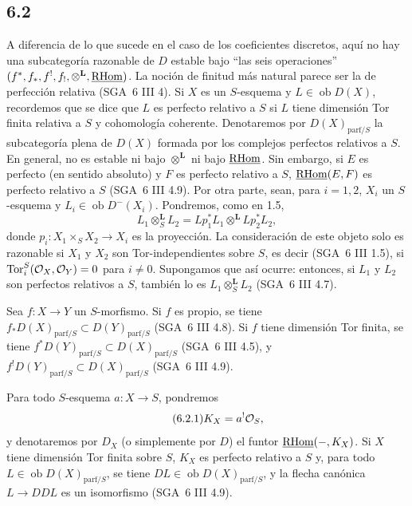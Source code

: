 \subsection*{6.2}
A diferencia de lo que sucede en el caso de los coeficientes discretos, aquí no hay una subcategoría razonable de $D$ estable bajo ``las seis operaciones'' $(f^*,f_*,f^!,f_!,\otimes^{\mathbf L},\underline{\mathrm{RHom}})$. La noción de finitud más natural parece ser la de perfección relativa (SGA~6 III 4). Si $X$ es un $S$-esquema y $L\in\operatorname{ob}D(X)$, recordemos que se dice que $L$ es perfecto relativo a $S$ si $L$ tiene dimensión Tor finita relativa a $S$ y cohomología coherente. Denotaremos por $D(X)_{\mathrm{parf}/S}$ la subcategoría plena de $D(X)$ formada por los complejos perfectos relativos a $S$. En general, no es estable ni bajo $\otimes^{\mathbf L}$ ni bajo $\underline{\mathrm{RHom}}$. Sin embargo, si $E$ es perfecto (en sentido absoluto) y $F$ es perfecto relativo a $S$, $\underline{\mathrm{RHom}}(E,F)$ es perfecto relativo a $S$ (SGA~6 III 4.9). Por otra parte, sean, para $i=1,2$, $X_i$ un $S$-esquema y $L_i\in\operatorname{ob}D^{-}(X_i)$. Pondremos, como en 1.5,
\[
L_1\otimes_S^{\mathbf L}L_2=Lp_1^*L_1\otimes^{\mathbf L}Lp_2^*L_2,
\]
donde $p_i:X_1\times_SX_2\to X_i$ es la proyección. La consideración de este objeto solo es razonable si $X_1$ y $X_2$ son Tor-independientes sobre $S$, es decir (SGA~6 III 1.5), si $\operatorname{Tor}_i^S(\mathcal{O}_X,\mathcal{O}_Y)=0$ para $i\ne0$. Supongamos que así ocurre: entonces, si $L_1$ y $L_2$ son perfectos relativos a $S$, también lo es $L_1\otimes_S^{\mathbf L}L_2$ (SGA~6 III 4.7).

Sea $f:X\to Y$ un $S$-morfismo. Si $f$ es propio, se tiene $f_*D(X)_{\mathrm{parf}/S}\subset D(Y)_{\mathrm{parf}/S}$ (SGA~6 III 4.8). Si $f$ tiene dimensión Tor finita, se tiene $f^*D(Y)_{\mathrm{parf}/S}\subset D(X)_{\mathrm{parf}/S}$ (SGA~6 III 4.5), y $f^!D(Y)_{\mathrm{parf}/S}\subset D(X)_{\mathrm{parf}/S}$ (SGA~6 III 4.9).

Para todo $S$-esquema $a:X\to S$, pondremos
\begin{equation}
\tag{6.2.1}
K_X=a^!\mathcal{O}_S,
\end{equation}
y denotaremos por $D_X$ (o simplemente por $D$) el funtor $\underline{\mathrm{RHom}}(-,K_X)$. Si $X$ tiene dimensión Tor finita sobre $S$, $K_X$ es perfecto relativo a $S$ y, para todo $L\in\operatorname{ob}D(X)_{\mathrm{parf}/S}$, se tiene $DL\in\operatorname{ob}D(X)_{\mathrm{parf}/S}$, y la flecha canónica $L\to DDL$ es un isomorfismo (SGA~6 III 4.9).

